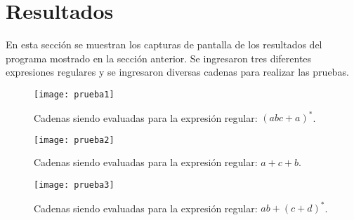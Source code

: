 \section{Resultados}


En esta sección se muestran los capturas de pantalla de los resultados del programa mostrado en la sección anterior. Se ingresaron tres diferentes expresiones regulares y se ingresaron diversas cadenas para realizar las pruebas.

\begin{figure}[H]
	\texttt{[image: prueba1]}
	\caption{Cadenas siendo evaluadas para la expresión regular: $(abc + a)^{*}$.}
	\label{fig:prueba1}
\end{figure}

\begin{figure}[H]
	\texttt{[image: prueba2]}
	\caption{Cadenas siendo evaluadas para la expresión regular: $a+c+b$.}
	\label{fig:prueba2}
\end{figure}

\begin{figure}[H]
	\texttt{[image: prueba3]}
	\caption{Cadenas siendo evaluadas para la expresión regular: $ab+(c+d)^{*}$.}
	\label{fig:prueba3}
\end{figure}





